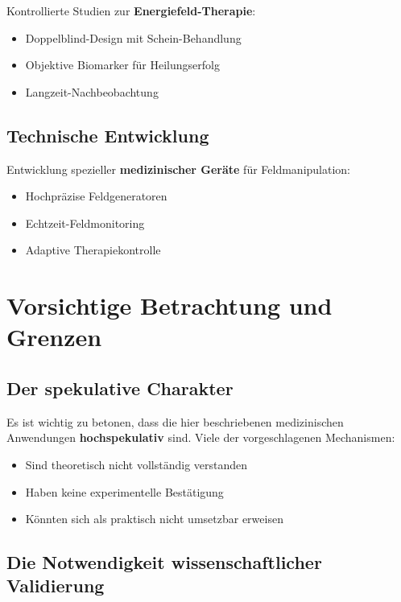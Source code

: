 \documentclass[12pt,a4paper]{report}
\begin{document}
	Kontrollierte Studien zur \textbf{Energiefeld-Therapie}:
	
	\begin{itemize}
		\item Doppelblind-Design mit Schein-Behandlung
		\item Objektive Biomarker für Heilungserfolg
		\item Langzeit-Nachbeobachtung
	\end{itemize}
	
	\subsection{Technische Entwicklung}
	
	Entwicklung spezieller \textbf{medizinischer Geräte} für Feldmanipulation:
	
	\begin{itemize}
		\item Hochpräzise Feldgeneratoren
		\item Echtzeit-Feldmonitoring
		\item Adaptive Therapiekontrolle
	\end{itemize}
	
	\section{Vorsichtige Betrachtung und Grenzen}
	
	\subsection{Der spekulative Charakter}
	
	Es ist wichtig zu betonen, dass die hier beschriebenen medizinischen Anwendungen \textbf{hochspekulativ} sind. Viele der vorgeschlagenen Mechanismen:
	
	\begin{itemize}
		\item Sind theoretisch nicht vollständig verstanden
		\item Haben keine experimentelle Bestätigung
		\item Könnten sich als praktisch nicht umsetzbar erweisen
	\end{itemize}
	
	\subsection{Die Notwendigkeit wissenschaftlicher Validierung}
	
\end{document}
